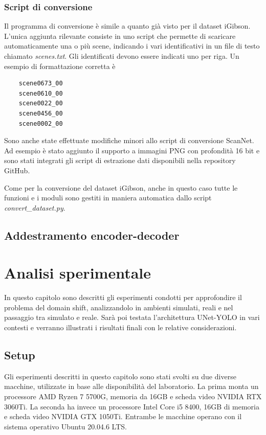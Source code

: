 \documentclass[12pt]{report}
\begin{document}
\subsection{Script di conversione}
\label{chap:script_di_conversione_scannet}

Il programma di conversione è simile a quanto già visto per il dataset iGibson. L'unica aggiunta rilevante consiste in uno script che permette di scaricare automaticamente una o più scene, indicando i vari identificativi in un file di testo chiamato \textit{scenes.txt}. Gli identificati devono essere indicati uno per riga. Un esempio di formattazione corretta è

\begin{verbatim}
	scene0673_00
	scene0610_00
	scene0022_00
	scene0456_00
	scene0002_00
\end{verbatim}

Sono anche state effettuate modifiche minori allo script di conversione ScanNet. Ad esempio è stato aggiunto il supporto a immagini PNG con profondità 16 bit e sono stati integrati gli script di estrazione dati disponibili nella repository GitHub.

Come per la conversione del dataset iGibson, anche in questo caso tutte le funzioni e i moduli sono gestiti in maniera automatica dallo script \textit{convert\_dataset.py}.

\section{Addestramento encoder-decoder}
\label{chap:addestramento_encoder_decoder}

\chapter{Analisi sperimentale}
\label{chap:analisi}

In questo capitolo sono descritti gli esperimenti condotti per approfondire il problema del domain shift, analizzandolo in ambienti simulati, reali e nel passaggio tra simulato e reale. Sarà poi testata l'architettura UNet-YOLO in vari contesti e verranno illustrati i risultati finali con le relative considerazioni.

\section{Setup}
\label{chap:setup}

Gli esperimenti descritti in questo capitolo sono stati svolti su due diverse macchine, utilizzate in base alle disponibilità del laboratorio. La prima monta un processore AMD Ryzen 7 5700G, memoria da 16GB e scheda video NVIDIA RTX 3060Ti. La seconda ha invece un processore Intel Core i5 8400, 16GB di memoria e scheda video NVIDIA GTX 1050Ti. Entrambe le macchine operano con il sistema operativo Ubuntu 20.04.6 LTS.
\end{document}
